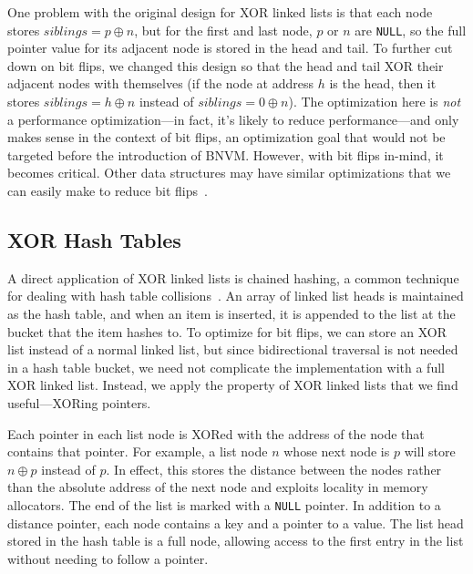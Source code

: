 One problem with the original design for XOR linked lists is that each node
stores $siblings = p \oplus n$, but for the first and last node, $p$ or $n$ are
\texttt{NULL}, so the full pointer value for its adjacent node is stored in the
head and tail. To further cut down on bit flips, we changed this design so that
the head and tail XOR their adjacent nodes with themselves (if the node at
address $h$ is the head, then it stores $siblings = h \oplus n$ instead of
$siblings = 0 \oplus n$). The optimization here is \textit{not} a performance
optimization---in fact, it's likely to reduce performance---and only makes sense
in the context of bit flips, an optimization goal that would not be
targeted before the introduction of BNVM. However, with bit flips in-mind, it
becomes critical. Other data structures may have similar optimizations that we
can easily make to reduce bit flips~.

\subsection{XOR Hash Tables}
\label{sec:xht_design}

A direct application of XOR linked lists is chained hashing, a common
technique for dealing with hash table collisions~\cite{clrs}. An array of linked list heads
is maintained as the hash table, and when an item is inserted, it is appended to
the list at the bucket that the item hashes to. To optimize for bit flips,
we can store an XOR list instead of a normal linked list, but
since bidirectional traversal is not needed in a hash table
bucket, we need not complicate the implementation with a full XOR linked
list. Instead, we apply the property of XOR linked lists that we find
useful---XORing pointers.

Each pointer in each list node is XORed with the address of the node that
contains that pointer. For example, a list node $n$ whose next node is $p$ will
store $n \oplus p$ instead of $p$. In effect, this stores the distance between
the nodes rather than the absolute address of the next node and exploits
locality in memory allocators. The end of the list is marked with a \texttt{NULL}
pointer. In addition to a distance pointer, each node contains a key and a
pointer to a value. The list head stored in the hash table is a full node,
allowing access to the first entry in the list without needing to follow a
pointer.

